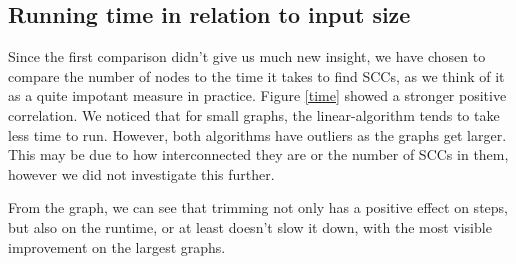\documentclass[../master/master.tex]{subfiles}
\begin{document}
\subsection{Running time in relation to input size}
Since the first comparison didn't give us much new insight, we have chosen to compare the number of nodes to the time it takes to find SCCs, as we think of it as a quite impotant measure in practice. Figure \ref{time} showed a stronger positive correlation. We noticed that for small graphs, the linear-algorithm tends to take less time to run. However, both algorithms have outliers as the graphs get larger. This may be due to how interconnected they are or the number of SCCs in them, however we did not investigate this further.

From the graph, we can see that trimming not only has a positive effect on steps, but also on the runtime, or at least doesn't slow it down, with the most visible improvement on the largest graphs.
\end{document}
